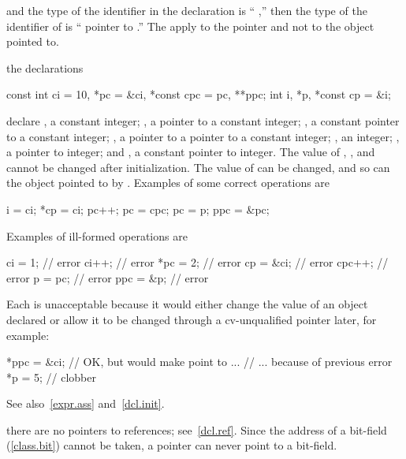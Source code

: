 and the type of the identifier in the declaration
is ``
,''
then the type of the identifier of
is `` pointer to
.''
%
%
The
apply to the pointer and not to the object pointed to.

\pnum
\enterexample
the declarations
%
%
\begin{codeblock}
const int ci = 10, *pc = &ci, *const cpc = pc, **ppc;
int i, *p, *const cp = &i;
\end{codeblock}

declare
,
a constant integer;
,
a pointer to a constant integer;
,
a constant pointer to a constant integer;
,
a pointer to a pointer to a constant integer;
,
an integer;
,
a pointer to integer; and
,
a constant pointer to integer.
The value of
,
,
and
cannot be changed after initialization.
The value of
can be changed, and so can the object pointed to by
.
Examples of
some correct operations are

\begin{codeblock}
i = ci;
*cp = ci;
pc++;
pc = cpc;
pc = p;
ppc = &pc;
\end{codeblock}

Examples of ill-formed operations are

\begin{codeblock}
ci = 1;				// error
ci++;				// error
*pc = 2;			// error
cp = &ci;			// error
cpc++;				// error
p = pc;				// error
ppc = &p;			// error
\end{codeblock}

Each is unacceptable because it would either change the value of an object declared
or allow it to be changed through a cv-unqualified pointer later, for example:

\begin{codeblock}
*ppc = &ci;			// OK, but would make  point to  ...
				// ... because of previous error
*p = 5;				// clobber 
\end{codeblock}
\exitexampleb

\pnum
See also~\ref{expr.ass} and~\ref{dcl.init}.

\pnum
\enternote
there are no pointers to references; see~\ref{dcl.ref}.
Since the address of a bit-field (\ref{class.bit}) cannot be taken,
a pointer can never point to a bit-field.
\exitnote

